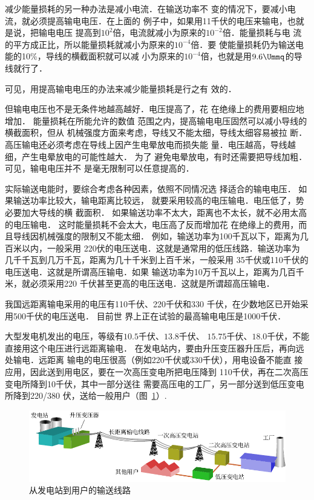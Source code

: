 减少能量损耗的另一种办法是减小电流．在输送功率不
变的情况下，要减小电流，就必须提高输电电压．在上面的
例子中，如果用11千伏的电压来输电，也就是说，把输电电压
提高到$10^2$倍，电流就减小为原来的$10^{-2}$倍．能量损耗与电
流的平方成正比，所以能量损耗就减小为原来的$10^{-4}$倍．要
使能量损耗仍为输送电能的10\%，导线的横截面积就可以减
小为原来的$10^{-4}$倍，也就是用$9.6 \Ummq $的导线就行了．

可见，用提高输电电压的办法来减少能量损耗是行之有
效的．

但输电电压也不是无条件地越高越好．电压提高了，花
在绝缘上的费用要相应地增加．
能量损耗在所能允许的数值
范围之内，提高输电电压固然可以减小导线的横截面积，但从
机械强度方面来考虑，导线又不能太细，导线太细容易被拉
断．
高压输电还必须考虑在导线上因产生电晕放电而损失能
量．电压越高，导线越细，产生电晕放电的可能性越大．
为了
避免电晕放电，有时还需要把导线加粗．可见，输电电压并不
是毫无限制可以任意提高的．

实际输送电能时，要综合考虑各种因素，依照不同情况选
择适合的输电电压．
如果输送功率比较大，输电距离比较远，
就要采用较高的电压输电．电压低了，势必要加大导线的横
截面积．
如果输送功率不太大，距离也不太长，就不必用太高
的电压输电．
这时能量损耗不会太大，电压高了反而增加花
在绝缘上的费用，而且导线因机械强度的限制又不能太细．
例如，输送功率为100千瓦以下，距离为几百米以内，一般采用
220伏的电压送电．这就是通常用的低压线路．输送功率为
几千千瓦到几万千瓦，距离为几十千米到上百千米，一般采用
35千伏或110千伏的电压送电．这就是所谓高压输电．如果
输送功率为10万千瓦以上，距离为几百千米，就必须采用220
千伏甚至更高的电压送电．这就是所谓超高压输电．

我国远距离输电采用的电压有110千伏、220千伏和330
千伏，在少数地区已开始采用500千伏的电压送电．
目前世
界上正在试验的最高输电电压是1000千伏．

大型发电机发出的电压，等级有$10.5$千伏、$13.8$千伏、
$15.75$千伏、$18.0$千伏，不能直接用这个电压进行远距离输电．
在发电站内，要由升压变压器升压后，再向远处输电．远距离
输电的电压很高（例如220千伏或330千伏），用电设备不能直
接应用，因此送到用电区，要在一次高压变电所把电压降到
110千伏，再在二次高压变电所降到10千伏，其中一部分送往
需要高压电的工厂，另一部分送到低压变电所降到220/380
伏，送给一般用户（图~\ref{fig_C_3-30}）.
\begin{figure}[htbp]
    \centering
    \includegraphics{fig/C/3-30.pdf}
    \caption{从发电站到用户的输送线路}\label{fig_C_3-30}
\end{figure}

